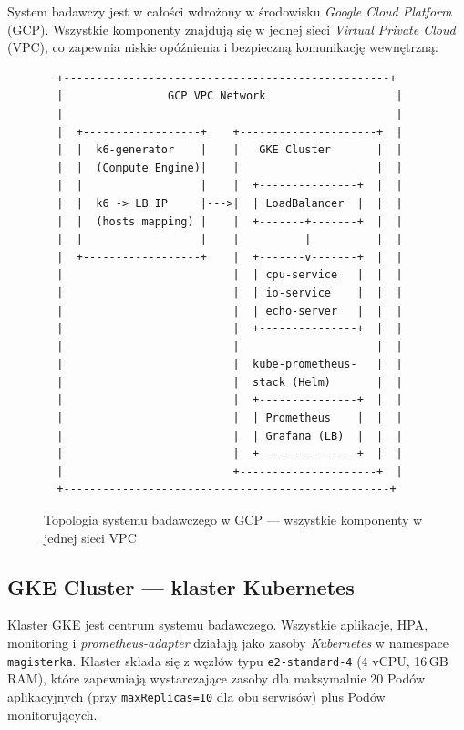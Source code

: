 System badawczy jest w całości wdrożony w środowisku \textit{Google Cloud Platform} (GCP). Wszystkie komponenty znajdują się w jednej sieci \textit{Virtual Private Cloud} (VPC), co zapewnia niskie opóźnienia i bezpieczną komunikację wewnętrzną:

\begin{figure}[H]
  \centering
  \begin{verbatim}
  +--------------------------------------------------+
  |                GCP VPC Network                    |
  |                                                   |
  |  +------------------+    +---------------------+  |
  |  |  k6-generator    |    |   GKE Cluster       |  |
  |  |  (Compute Engine)|    |                     |  |
  |  |                  |    |  +---------------+  |  |
  |  |  k6 -> LB IP     |--->|  | LoadBalancer  |  |  |
  |  |  (hosts mapping) |    |  +-------+-------+  |  |
  |  |                  |    |          |          |  |
  |  +------------------+    |  +-------v-------+  |  |
  |                          |  | cpu-service   |  |  |
  |                          |  | io-service    |  |  |
  |                          |  | echo-server   |  |  |
  |                          |  +---------------+  |  |
  |                          |                     |  |
  |                          |  kube-prometheus-   |  |
  |                          |  stack (Helm)       |  |
  |                          |  +---------------+  |  |
  |                          |  | Prometheus    |  |  |
  |                          |  | Grafana (LB)  |  |  |
  |                          |  +---------------+  |  |
  |                          +---------------------+  |
  +--------------------------------------------------+
  \end{verbatim}
  \caption{Topologia systemu badawczego w GCP — wszystkie komponenty w jednej sieci VPC}
  \label{fig:gcp-topology}
\end{figure}

\subsection{GKE Cluster — klaster Kubernetes}

Klaster GKE jest centrum systemu badawczego. Wszystkie aplikacje, HPA, monitoring i \textit{prometheus-adapter} działają jako zasoby \textit{Kubernetes} w namespace \texttt{magisterka}. Klaster składa się z węzłów typu \texttt{e2-standard-4} (4 vCPU, 16\,GB RAM), które zapewniają wystarczające zasoby dla maksymalnie 20 Podów aplikacyjnych (przy \texttt{maxReplicas=10} dla obu serwisów) plus Podów monitorujących.

